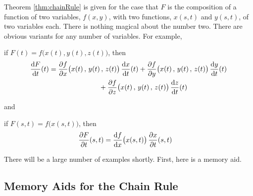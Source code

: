 Theorem \ref{thm:chainRule} is given for the case that $F$ is the
composition of a function of two variables, $f(x,y)$, with two functions, 
$x(s,t)$ and $y(s,t)$,  of two variables each. There is nothing magical about 
the number two. There are obvious variants for any number of variables. 
For example,
\begin{impeqn}\label{eqn chain rule A}
if $F(t) = f\big(x(t),y(t),z(t)\big)$, then
\begin{align*}
\diff{F}{t}(t) &= \pdiff{f}{x}\big(x(t)\,,\,y(t)\,,\,z(t)\big)\, \diff{x}{t}(t)
           +\pdiff{f}{y}\big(x(t)\,,\,y(t)\,,\,z(t)\big)\, \diff{y}{t}(t) \\
     &\hskip1in   +\pdiff{f}{z}\big(x(t)\,,\,y(t)\,,\,z(t)\big)\, \diff{z}{t}(t)
\end{align*}

\end{impeqn}
and
\begin{impeqn}\label{eqn chain rule B}
if $F(s,t) = f\big(x(s,t)\big)$, then
\begin{align*}
\pdiff{F}{t}(s,t) &= \diff{f}{x}\big(x(s,t)\big)\, \pdiff{x}{t}(s,t)
\end{align*}

\end{impeqn}

There will be a large number of examples shortly. First, here is a
memory aid.

\subsection{Memory Aids for the Chain Rule}
\label{subsec memory aid}

